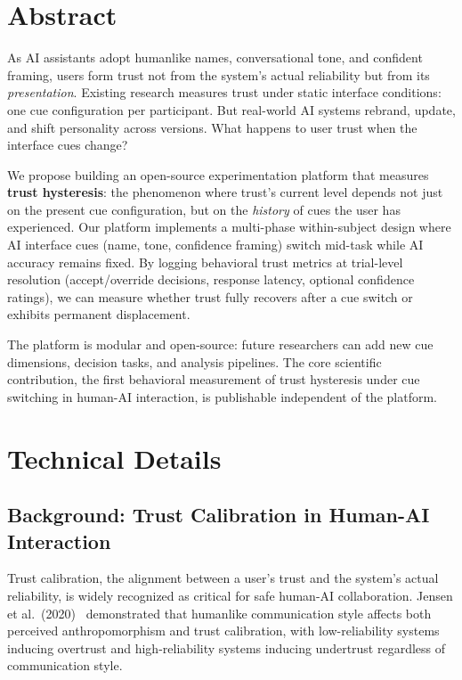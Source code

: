 \documentclass[12pt]{article}
\begin{document}
\section{Abstract}

As AI assistants adopt humanlike names, conversational tone, and confident framing, users form trust not from the system's actual reliability but from its \emph{presentation}. Existing research measures trust under static interface conditions: one cue configuration per participant. But real-world AI systems rebrand, update, and shift personality across versions. What happens to user trust when the interface cues change?

We propose building an open-source experimentation platform that measures \textbf{trust hysteresis}: the phenomenon where trust's current level depends not just on the present cue configuration, but on the \emph{history} of cues the user has experienced. Our platform implements a multi-phase within-subject design where AI interface cues (name, tone, confidence framing) switch mid-task while AI accuracy remains fixed. By logging behavioral trust metrics at trial-level resolution (accept/override decisions, response latency, optional confidence ratings), we can measure whether trust fully recovers after a cue switch or exhibits permanent displacement.

The platform is modular and open-source: future researchers can add new cue dimensions, decision tasks, and analysis pipelines. The core scientific contribution, the first behavioral measurement of trust hysteresis under cue switching in human-AI interaction, is publishable independent of the platform.

\section{Technical Details}

\subsection{Background: Trust Calibration in Human-AI Interaction}

Trust calibration, the alignment between a user's trust and the system's actual reliability, is widely recognized as critical for safe human-AI collaboration. Jensen et al.~(2020)~\cite{jensen2020} demonstrated that humanlike communication style affects both perceived anthropomorphism and trust calibration, with low-reliability systems inducing overtrust and high-reliability systems inducing undertrust regardless of communication style.
\end{document}
